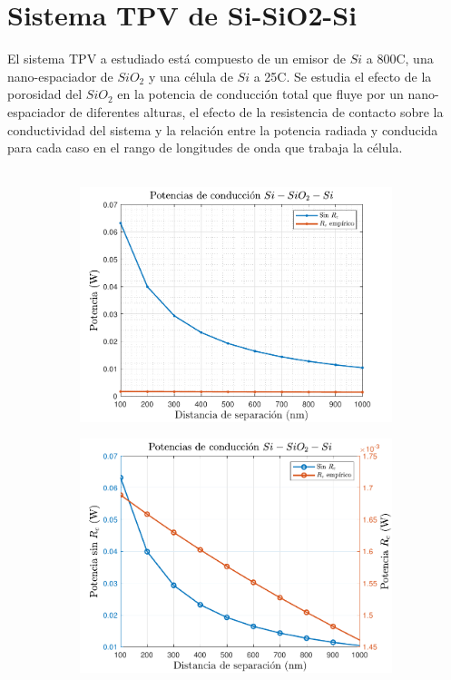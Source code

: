 \section{Sistema TPV de Si-SiO2-Si}
El sistema TPV a estudiado está compuesto de un emisor de $Si$ a 800\textdegree C, una nano-espaciador de $SiO_2$ y una célula de $Si$ a 25\textdegree C. Se estudia el efecto de la porosidad del $SiO_2$ en la potencia de conducción total que fluye por un nano-espaciador de diferentes alturas, el efecto de la resistencia de contacto sobre la conductividad del sistema y la relación entre la potencia radiada y conducida para cada caso en el rango de longitudes de onda que trabaja la célula.\\\\
\begin{figure}[H]
	\centering
	\begin{subfigure}[b]{0.49\textwidth}
		\centering
		\includegraphics[width=1.0\textwidth]{figuras/Resultados/conduccion/pdf/Prc_SiSiO2Si.pdf}
		\caption{ }
		\label{fig:Prc_SiSiO2Si}
	\end{subfigure}
	\begin{subfigure}[b]{0.49\textwidth}
		\centering
		\includegraphics[width=1.0\textwidth]{figuras/Resultados/conduccion/pdf/Prc2_SiSiO2Si.pdf}

\end{subfigure}
\end{figure}
